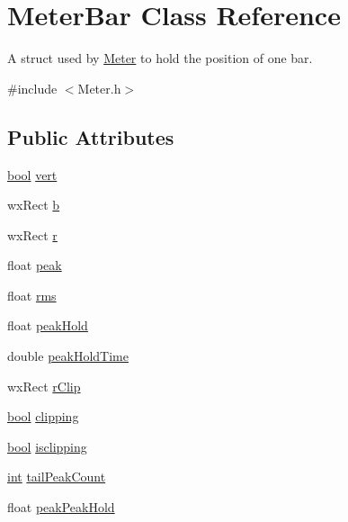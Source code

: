 \hypertarget{struct_meter_bar}{}\section{Meter\+Bar Class Reference}
\label{struct_meter_bar}


A struct used by \hyperlink{class_meter}{Meter} to hold the position of one bar.  




{\ttfamily \#include $<$Meter.\+h$>$}

\subsection*{Public Attributes}
\begin{DoxyCompactItemize}
\item 
\hyperlink{mac_2config_2i386_2lib-src_2libsoxr_2soxr-config_8h_abb452686968e48b67397da5f97445f5b}{bool} \hyperlink{struct_meter_bar_a842a6130e175626ac4bcf3e1df60e7b0}{vert}
\item 
wx\+Rect \hyperlink{struct_meter_bar_aaa66ea8fc3b5290ab41b7490dce5bbc3}{b}
\item 
wx\+Rect \hyperlink{struct_meter_bar_ae0020ac33b767c882cad1d6e0e1d3f1a}{r}
\item 
float \hyperlink{struct_meter_bar_a4b4aafca88830dbc403688711e780de9}{peak}
\item 
float \hyperlink{struct_meter_bar_a68fedd727318bcce9d423fc527c7fd45}{rms}
\item 
float \hyperlink{struct_meter_bar_af2ef854ab333ad2fd57402b0bc748d37}{peak\+Hold}
\item 
double \hyperlink{struct_meter_bar_ad725e2ab4a80593e0de3d59300256f1b}{peak\+Hold\+Time}
\item 
wx\+Rect \hyperlink{struct_meter_bar_a1228c67130a0299e865782a7759d8a08}{r\+Clip}
\item 
\hyperlink{mac_2config_2i386_2lib-src_2libsoxr_2soxr-config_8h_abb452686968e48b67397da5f97445f5b}{bool} \hyperlink{struct_meter_bar_aad87b78a5556c0d9eb16855c5025164b}{clipping}
\item 
\hyperlink{mac_2config_2i386_2lib-src_2libsoxr_2soxr-config_8h_abb452686968e48b67397da5f97445f5b}{bool} \hyperlink{struct_meter_bar_a26612b507724e134343daa4d2eb238f0}{isclipping}
\item 
\hyperlink{xmltok_8h_a5a0d4a5641ce434f1d23533f2b2e6653}{int} \hyperlink{struct_meter_bar_a64cc0b3fd7fce6ae589ea4ce5721f1b0}{tail\+Peak\+Count}
\item 
float \hyperlink{struct_meter_bar_a41b9908cda24b5d06b72fbae569c9904}{peak\+Peak\+Hold}
\end{DoxyCompactItemize}


